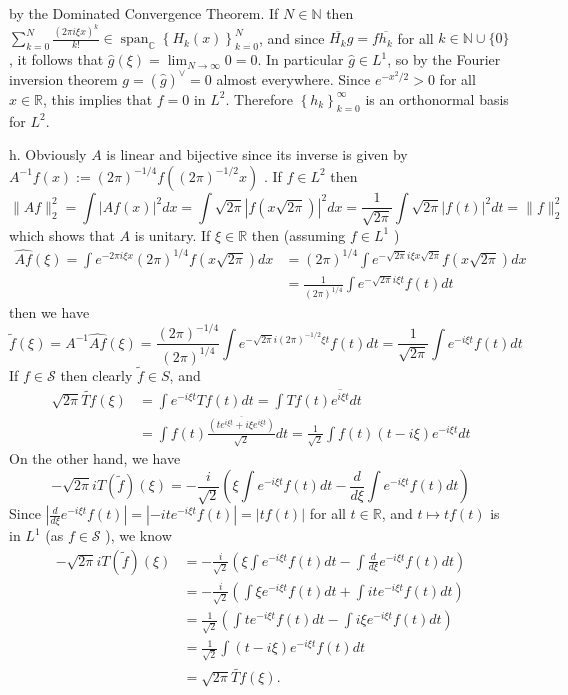 \documentclass[lang=en,11pt,a4paper,citestyle =authoryear]{elegantpaper}
\begin{document}
by the Dominated Convergence Theorem. If $N \in \mathbb{N}$ then $\sum_{k=0}^{N} \frac{(2 \pi i \xi x)^{k}}{k !} \in \operatorname{span}_{\mathbb{C}}\left\{H_{k}(x)\right\}_{k=0}^{N}$, and since $\overline{H_{k}} g=f \overline{h_{k}}$ for all $k \in \mathbb{N} \cup\{0\}$, it follows that $\widehat{g}(\xi)=\lim _{N \rightarrow \infty} 0=0$. In particular $\widehat{g} \in L^{1}$, so by the Fourier inversion theorem $g=(\widehat{g})^{\vee}=0$ almost everywhere. Since $e^{-x^{2} / 2}>0$ for all $x \in \mathbb{R}$, this implies that $f=0$ in $L^{2}$. Therefore $\left\{h_{k}\right\}_{k=0}^{\infty}$ is an orthonormal basis for $L^{2}$.\par
h. Obviously $A$ is linear and bijective since its inverse is given by $A^{-1} f(x):=(2 \pi)^{-1 / 4} f\left((2 \pi)^{-1 / 2} x\right)$ . If $f \in L^{2}$ then
\[
\|A f\|_{2}^{2}=\int|A f(x)|^{2} d x=\int \sqrt{2 \pi}|f(x \sqrt{2 \pi})|^{2} d x=\frac{1}{\sqrt{2 \pi}} \int \sqrt{2 \pi}|f(t)|^{2} d t=\|f\|_{2}^{2}
\]
which shows that $A$ is unitary. If $\xi \in \mathbb{R}$ then (assuming $f \in L^{1}$ )
\[
\begin{aligned}
\widehat{A f}(\xi)=\int e^{-2 \pi i \xi x}(2 \pi)^{1 / 4} f(x \sqrt{2 \pi}) d x&=(2 \pi)^{1 / 4} \int e^{-\sqrt{2 \pi} i \xi x \sqrt{2 \pi}} f(x \sqrt{2 \pi}) d x\\ &=\frac{1}{(2 \pi)^{1 / 4}} \int e^{-\sqrt{2 \pi} i \xi t} f(t) d t
\end{aligned}
\]
then we have
\[
\widetilde{f}(\xi)=A^{-1} \widehat{A f}(\xi)=\frac{(2 \pi)^{-1 / 4}}{(2 \pi)^{1 / 4}} \int e^{-\sqrt{2 \pi} i(2 \pi)^{-1 / 2} \xi t} f(t) d t=\frac{1}{\sqrt{2 \pi}} \int e^{-i \xi t} f(t) d t
\]
If $f \in \mathcal{S}$ then clearly $\tilde{f} \in S$, and
\[
\begin{aligned}
\sqrt{2 \pi} \widetilde{T f}(\xi)&=\int e^{-i \xi t} T f(t) d t=\int T f(t) \overline{e^{i \xi t}} d t\\ &=\int f(t) \frac{\overline{\left(t e^{i \xi t}+i \xi e^{i \xi t}\right)}}{\sqrt{2}} d t=\frac{1}{\sqrt{2}} \int f(t)(t-i \xi) e^{-i \xi t} d t
\end{aligned}
\]
On the other hand, we have
\[
-\sqrt{2 \pi} i T(\tilde{f})(\xi)=-\frac{i}{\sqrt{2}}\left(\xi \int e^{-i \xi t} f(t) d t-\frac{d}{d \xi} \int e^{-i \xi t} f(t) d t\right)
\]
Since $\left|\frac{d}{d \xi} e^{-i \xi t} f(t)\right|=\left|-i t e^{-i \xi t} f(t)\right|=|t f(t)|$ for all $t \in \mathbb{R}$, and $t \mapsto t f(t)$ is in $L^{1}$ (as $f \in \mathcal{S}$ ), we know
\[
\begin{aligned}
-\sqrt{2 \pi} i T(\widetilde{f})(\xi) & =-\frac{i}{\sqrt{2}}\left(\xi \int e^{-i \xi t} f(t) d t-\int \frac{d}{d \xi} e^{-i \xi t} f(t) d t\right) \\
& =-\frac{i}{\sqrt{2}}\left(\int \xi e^{-i \xi t} f(t) d t+\int i t e^{-i \xi t} f(t) d t\right) \\
& =\frac{1}{\sqrt{2}}\left(\int t e^{-i \xi t} f(t) d t-\int i \xi e^{-i \xi t} f(t) d t\right) \\
& =\frac{1}{\sqrt{2}} \int(t-i \xi) e^{-i \xi t} f(t) d t \\
& =\sqrt{2 \pi} \widetilde{T f}(\xi) .
\end{aligned}
\]
\end{document}
